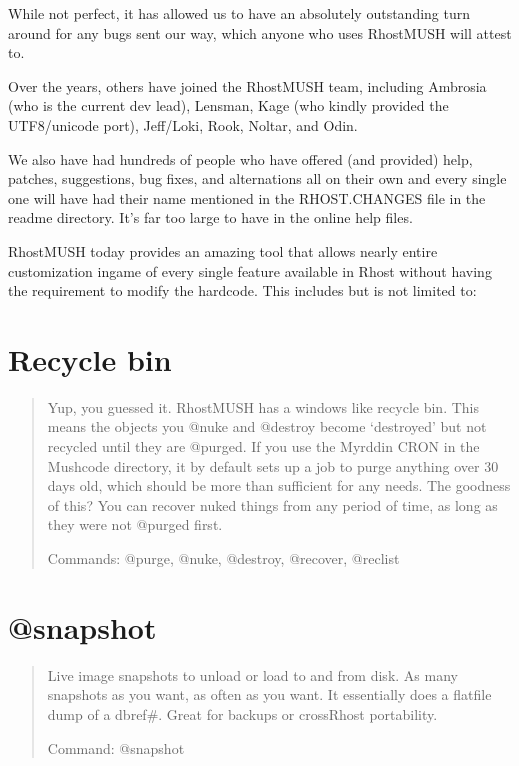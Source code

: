 \documentclass[letterpaper,10pt,english]{sphinxmanual}
\begin{document}
\sphinxAtStartPar
While not perfect, it has allowed us to have an absolutely outstanding
turn around for any bugs sent our way, which anyone who uses RhostMUSH will
attest to.

\sphinxAtStartPar
Over the years, others have joined the RhostMUSH team, including Ambrosia
(who is the current dev lead), Lensman, Kage (who kindly provided the
UTF8/unicode port), Jeff/Loki, Rook, Noltar, and Odin.

\sphinxAtStartPar
We also have had hundreds of people who have offered (and provided) help,
patches, suggestions, bug fixes, and alternations all on their own and
every single one will have had their name mentioned in the RHOST.CHANGES
file in the readme directory.  It’s far too large to have in the online
help files.

\sphinxAtStartPar
RhostMUSH today provides an amazing tool that allows nearly entire
customization in\sphinxhyphen{}game of every single feature available in Rhost without
having the requirement to modify the hardcode.  This includes but is
not limited to:


\section{Recycle bin}
\label{\detokenize{features:recycle-bin}}\begin{quote}

\sphinxAtStartPar
Yup, you guessed it.  RhostMUSH has a windows like recycle bin.
This means the objects you @nuke and @destroy become ‘destroyed’
but not recycled until they are @purged.  If you use the Myrddin
CRON in the Mushcode directory, it by default sets up a job
to purge anything over 30 days old, which should be more than
sufficient for any needs.  The goodness of this?  You can recover
nuked things from any period of time, as long as they were not
@purged first.

\sphinxAtStartPar
Commands: @purge, @nuke, @destroy, @recover, @reclist
\end{quote}


\section{@snapshot}
\label{\detokenize{features:snapshot}}\begin{quote}

\sphinxAtStartPar
Live image snapshots to unload or load to and from
disk.  As many snapshots as you want, as often as you want.
It essentially does a flatfile dump of a dbref\#.  Great for
backups or cross\sphinxhyphen{}Rhost portability.

\sphinxAtStartPar
Command: @snapshot
\end{quote}
\end{document}
